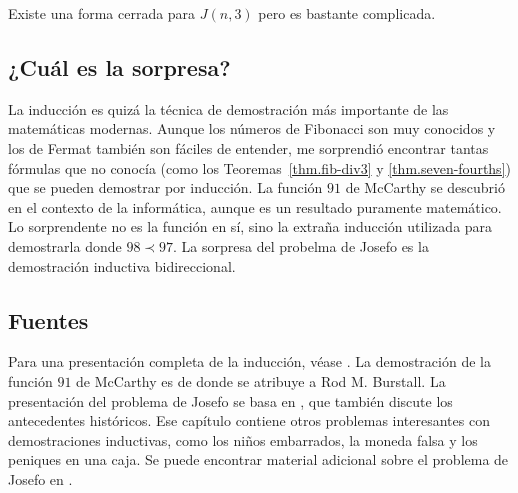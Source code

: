 Existe una forma cerrada para $J(n,3)$ pero es bastante complicada.


\subsection*{¿Cuál es la sorpresa?}

La inducción es quizá la técnica de demostración más importante de las matemáticas modernas. Aunque los números de Fibonacci son muy conocidos y los de Fermat también son fáciles de entender, me sorprendió encontrar tantas fórmulas que no conocía (como los Teoremas~\ref{thm.fib-div3} y \ref{thm.seven-fourths}) que se pueden demostrar por inducción. La función $91$ de McCarthy se descubrió en el contexto de la informática, aunque es un resultado puramente matemático. Lo sorprendente no es la función en sí, sino la extraña inducción utilizada para demostrarla donde $98\prec 97$. La sorpresa del probelma de Josefo es la demostración inductiva bidireccional.

\subsection*{Fuentes}

Para una presentación completa de la inducción, véase \cite{gunderson}. La demostración de la función $91$ de McCarthy es de \cite{manna} donde se atribuye a Rod M. Burstall. La presentación del problema de Josefo se basa en \cite[Capítulo~17]{gunderson}, que también discute los antecedentes históricos. Ese capítulo contiene otros problemas interesantes con demostraciones inductivas, como los niños embarrados, la moneda falsa y los peniques en una caja. Se puede encontrar material adicional sobre el problema de Josefo en \cite{schumer,wiki:josephus}.
